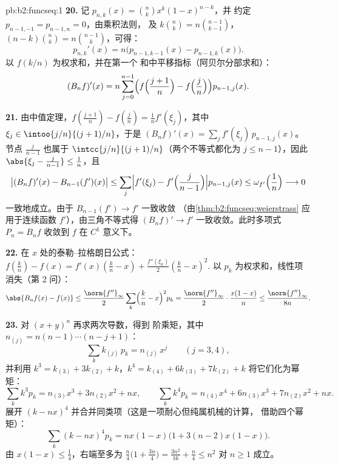 \begin{solution}{pb:b2:funcseq:1}
\textbf{20.} 记 $p_{n,k}(x) = \binom nk x^k(1-x)^{n-k}$，并
约定 $p_{n-1,-1} = p_{n-1,n} = 0$，由乘积法则，
及 $k\binom nk = n\binom{n-1}{k-1}$，$(n-k)\binom nk =
n\binom{n-1}{k}$，可得：
\[
p_{n,k}'(x) = n\bigl(p_{n-1,k-1}(x) - p_{n-1,k}(x)\bigr) .
\]
以 $f(k/n)$ 为权求和，并在第一个
和中平移指标（阿贝尔分部求和）：
\[
(B_nf)'(x) = n\sum_{j=0}^{n-1}\Bigl(f\Bigl(\frac{j+1}n\Bigr)
- f\Bigl(\frac jn\Bigr)\Bigr)p_{n-1,j}(x) .
\]

\textbf{21.} 由中值定理，$f(\frac{j+1}n) -
f(\frac jn) = \frac1n f'(\xi_j)$，其中 $\xi_j \in
\intoo{j/n}{(j+1)/n}$，于是 $(B_nf)'(x) = \sum_j
f'(\xi_j)\,p_{n-1,j}(x)$。节点 $\frac{j}{n-1}$ 也属于
$\intcc{j/n}{(j+1)/n}$（两个不等式都化为 $j \leq
n-1$），因此 $\abs{\xi_j - \frac j{n-1}} \leq \frac1n$，且
\[
\bigl|(B_nf)'(x) - B_{n-1}(f')(x)\bigr|
\leq \sum_j\Bigl|f'(\xi_j) -
f'\Bigl(\frac{j}{n-1}\Bigr)\Bigr| p_{n-1,j}(x)
\leq \omega_{f'}\Bigl(\frac1n\Bigr) \longrightarrow 0
\]
一致地成立。由于 $B_{n-1}(f') \to f'$ 一致收敛
（由\cref{thm:b2:funcseq:weierstrass} 应用于连续函数
$f'$），由三角不等式得 $(B_nf)' \to f'$
一致收敛。此时多项式 $P_n = B_nf$ 收敛到 $f$
在 $C^1$ 意义下。

\textbf{22.} 在 $x$ 处的泰勒--拉格朗日公式：$f(\frac kn) - f(x) =
f'(x)(\frac kn - x) + \frac{f''(\xi_k)}2(\frac kn - x)^2$.
以 $p_k$ 为权求和，线性项消失（第 2 问）：
\[
\abs{B_nf(x) - f(x)}
\leq \frac{\norm{f''}_\infty}{2}\sum_k\Bigl(\frac kn -
x\Bigr)^2p_k
= \frac{\norm{f''}_\infty}{2}\cdot\frac{x(1-x)}{n}
\leq \frac{\norm{f''}_\infty}{8n} .
\]

\textbf{23.} 对 $(x+y)^n$ 再求两次导数，得到
阶乘矩，其中 $n_{(j)} = n(n-1)\cdots(n-j+1)$：
\[
\sum_k k_{(j)}\,p_k = n_{(j)}\,x^j \qquad (j = 3, 4),
\]
并利用 $k^3 = k_{(3)} + 3k_{(2)} + k$，$k^4 = k_{(4)} + 6k_{(3)} +
7k_{(2)} + k$ 将它们化为幂矩：
\[
\sum_k k^3p_k = n_{(3)}x^3 + 3n_{(2)}x^2 + nx,
\qquad
\sum_k k^4p_k = n_{(4)}x^4 + 6n_{(3)}x^3 + 7n_{(2)}x^2 + nx .
\]
展开 $(k - nx)^4$ 并合并同类项（这是一项耐心但纯属机械的计算，
借助四个幂矩）：
\[
\sum_k(k-nx)^4p_k = nx(1-x)\bigl(1 + 3(n-2)x(1-x)\bigr) .
\]
由 $x(1-x) \leq \frac14$，右端至多为
$\frac n4\bigl(1 + \frac{3n}4\bigr) = \frac{3n^2}{16} +
\frac n4 \leq n^2$ 对 $n \geq 1$ 成立。


\end{solution}
